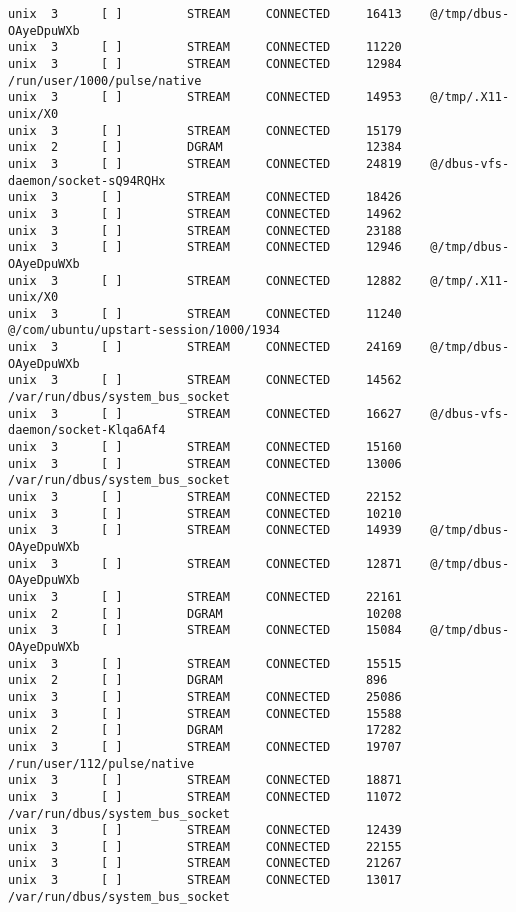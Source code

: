\begin{lstlisting}
unix  3      [ ]         STREAM     CONNECTED     16413    @/tmp/dbus-OAyeDpuWXb
unix  3      [ ]         STREAM     CONNECTED     11220    
unix  3      [ ]         STREAM     CONNECTED     12984    /run/user/1000/pulse/native
unix  3      [ ]         STREAM     CONNECTED     14953    @/tmp/.X11-unix/X0
unix  3      [ ]         STREAM     CONNECTED     15179    
unix  2      [ ]         DGRAM                    12384    
unix  3      [ ]         STREAM     CONNECTED     24819    @/dbus-vfs-daemon/socket-sQ94RQHx
unix  3      [ ]         STREAM     CONNECTED     18426    
unix  3      [ ]         STREAM     CONNECTED     14962    
unix  3      [ ]         STREAM     CONNECTED     23188    
unix  3      [ ]         STREAM     CONNECTED     12946    @/tmp/dbus-OAyeDpuWXb
unix  3      [ ]         STREAM     CONNECTED     12882    @/tmp/.X11-unix/X0
unix  3      [ ]         STREAM     CONNECTED     11240    @/com/ubuntu/upstart-session/1000/1934
unix  3      [ ]         STREAM     CONNECTED     24169    @/tmp/dbus-OAyeDpuWXb
unix  3      [ ]         STREAM     CONNECTED     14562    /var/run/dbus/system_bus_socket
unix  3      [ ]         STREAM     CONNECTED     16627    @/dbus-vfs-daemon/socket-Klqa6Af4
unix  3      [ ]         STREAM     CONNECTED     15160    
unix  3      [ ]         STREAM     CONNECTED     13006    /var/run/dbus/system_bus_socket
unix  3      [ ]         STREAM     CONNECTED     22152    
unix  3      [ ]         STREAM     CONNECTED     10210    
unix  3      [ ]         STREAM     CONNECTED     14939    @/tmp/dbus-OAyeDpuWXb
unix  3      [ ]         STREAM     CONNECTED     12871    @/tmp/dbus-OAyeDpuWXb
unix  3      [ ]         STREAM     CONNECTED     22161    
unix  2      [ ]         DGRAM                    10208    
unix  3      [ ]         STREAM     CONNECTED     15084    @/tmp/dbus-OAyeDpuWXb
unix  3      [ ]         STREAM     CONNECTED     15515    
unix  2      [ ]         DGRAM                    896      
unix  3      [ ]         STREAM     CONNECTED     25086    
unix  3      [ ]         STREAM     CONNECTED     15588    
unix  2      [ ]         DGRAM                    17282    
unix  3      [ ]         STREAM     CONNECTED     19707    /run/user/112/pulse/native
unix  3      [ ]         STREAM     CONNECTED     18871    
unix  3      [ ]         STREAM     CONNECTED     11072    /var/run/dbus/system_bus_socket
unix  3      [ ]         STREAM     CONNECTED     12439    
unix  3      [ ]         STREAM     CONNECTED     22155    
unix  3      [ ]         STREAM     CONNECTED     21267    
unix  3      [ ]         STREAM     CONNECTED     13017    /var/run/dbus/system_bus_socket

\end{lstlisting}
